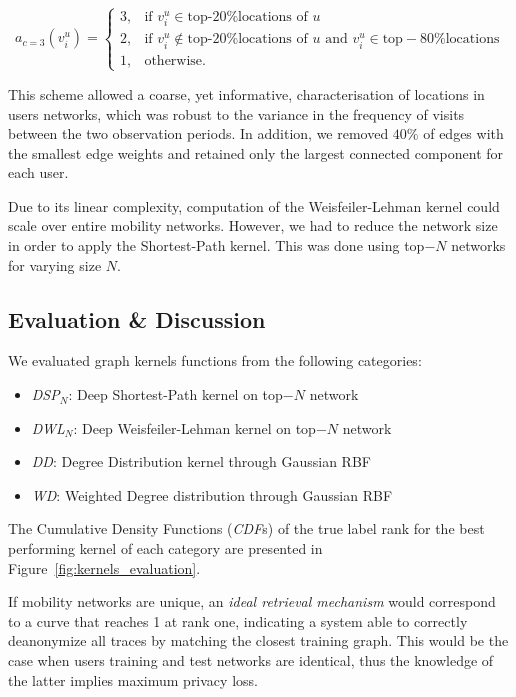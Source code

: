 \begin{equation*}
	a_{c=3}\left(v_i^u\right)=
	\begin{cases}
		 3, &  \mbox{if } v_i^u \in \mbox{top-20\% locations of } u  \\
		 2, &  \mbox{if } v_i^u  \notin \mbox{top-20}\% \mbox{locations of }  u   \mbox{ and }  v_i^u \in \mbox{top}-80\% \mbox{locations}\\
		 1, &  \mbox{otherwise}.
	\end{cases}
\end{equation*}

This scheme allowed a coarse, yet informative, characterisation of locations in users networks, which was robust to the variance in the frequency of visits between the two observation periods. In addition, we removed $40\%$ of edges with the smallest edge weights and retained only the largest connected component for each user.


Due to its linear complexity, computation of the Weisfeiler-Lehman kernel could scale over entire mobility networks.
However, we had to reduce the network size in order to apply the Shortest-Path kernel.
This was done using top$-N$ networks for varying size $N$.



\subsection{Evaluation \& Discussion}

We evaluated graph kernels functions from the following categories:
\begin{itemize}
	\item \emph{DSP}$_{N}$: Deep Shortest-Path kernel on top$-N$ network
	\item \emph{DWL}$_{N}$: Deep Weisfeiler-Lehman kernel on top$-N$ network
	\item \emph{DD}: Degree Distribution kernel through Gaussian RBF
	\item \emph{WD}: Weighted Degree distribution through Gaussian RBF
\end{itemize}
The  Cumulative Density Functions (\emph{CDF}s) of the  true label rank for the best performing kernel of each category are presented in Figure~\ref{fig:kernels_evaluation}.

If mobility networks are unique, an \emph{ideal retrieval mechanism} would correspond to a curve that reaches 1 at rank one, indicating a system able to correctly deanonymize all traces by matching the closest training graph.
This would be the case when users training and test networks are identical, thus the knowledge of the latter implies maximum privacy loss.

